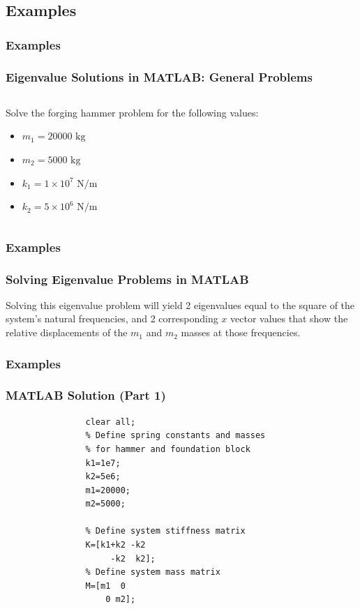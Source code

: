 \documentclass[fleqn]{beamer} %
\newcommand{\sectionIIsubsectionVtitle}{Examples}
\begin{document}
		
		\subsection{\sectionIIsubsectionVtitle}\label{sectionIIsubsectionV}	

			\begin{frame}
				\frametitle{\sectionIIsubsectionVtitle}
				\bigskip

				\frametitle{Eigenvalue Solutions in MATLAB: General Problems}
			  \begin{columns}
			    \begin{column}{0.5\textwidth}
			      Solve the forging hammer problem for the following values:
			      \begin{itemize}
			      \item $m_1 = 20000 \text{~kg}$
			      \item $m_2 = 5000 \text{~kg}$
			      \item $k_1 = 1 \times 10^7 \text{~N/m}$
			      \item $k_2 = 5 \times 10^6 \text{~N/m}$
			      \end{itemize}
			    \end{column}
			    \begin{column}{0.5\textwidth}
			    \end{column}
			  \end{columns}

				\btVFill 
			\end{frame}


			\begin{frame}
				\frametitle{\sectionIIsubsectionVtitle}
				\bigskip

				  \frametitle{Solving Eigenvalue Problems in MATLAB}
  
				  Solving this eigenvalue problem will yield 2 eigenvalues equal to
				  the square of the system's natural frequencies, and 2 corresponding
				  $x$ vector values that show the relative displacements of the $m_1$
				  and $m_2$ masses at those frequencies.

				\btVFill 
			\end{frame}



			\begin{frame}[fragile]
				\frametitle{\sectionIIsubsectionVtitle}
				\bigskip

				  \frametitle{MATLAB Solution (Part 1)}

				  \begin{lstlisting}
				clear all;
				% Define spring constants and masses
				% for hammer and foundation block
				k1=1e7;
				k2=5e6;
				m1=20000;
				m2=5000;

				% Define system stiffness matrix
				K=[k1+k2 -k2
				     -k2  k2];
				% Define system mass matrix
				M=[m1  0
				    0 m2];
				  \end{lstlisting}


				\btVFill 
			\end{frame}
\end{document}
